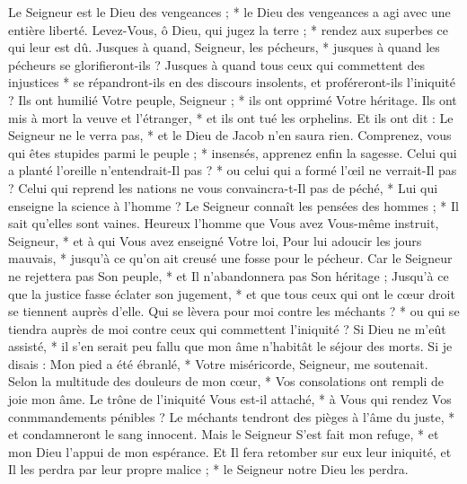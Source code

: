  Le Seigneur est le Dieu des vengeances ; * le Dieu des vengeances a agi avec une entière liberté.
\versseparator
 Levez-Vous, ô Dieu, qui jugez la terre ; * rendez aux superbes ce qui leur est dû.
\versseparator
 Jusques à quand, Seigneur, les pécheurs, * jusques à quand les pécheurs se glorifieront-ils ?
\versseparator
 Jusques à quand tous ceux qui commettent des injustices * se répandront-ils en des discours insolents, et proféreront-ils l'iniquité ?
\versseparator
 Ils ont humilié Votre peuple, Seigneur ; * ils ont opprimé Votre héritage.
\versseparator
 Ils ont mis à mort la veuve et l'étranger, * et ils ont tué les orphelins.
\versseparator
 Et ils ont dit : Le Seigneur ne le verra pas, * et le Dieu de Jacob n'en saura rien.
\versseparator
 Comprenez, vous qui êtes stupides parmi le peuple ; * insensés, apprenez enfin la sagesse.
\versseparator
 Celui qui a planté l'oreille n'entendrait-Il pas ? * ou celui qui a formé l'œil ne verrait-Il pas ?
\versseparator
 Celui qui reprend les nations ne vous convaincra-t-Il pas de péché, * Lui qui enseigne la science à l'homme ?
\versseparator
 Le Seigneur connaît les pensées des hommes ; * Il sait qu'elles sont vaines.
\versseparator
 Heureux l'homme que Vous avez Vous-même instruit, Seigneur, * et à qui Vous avez enseigné Votre loi,
\versseparator
 Pour lui adoucir les jours mauvais, * jusqu'à ce qu'on ait creusé une fosse pour le pécheur.
\versseparator
 Car le Seigneur ne rejettera pas Son peuple, * et Il n'abandonnera pas Son héritage ;
\versseparator
 Jusqu'à ce que la justice fasse éclater son jugement, * et que tous ceux qui ont le cœur droit se tiennent auprès d'elle.
\versseparator
 Qui se lèvera pour moi contre les méchants ? * ou qui se tiendra auprès de moi contre ceux qui commettent l'iniquité ?
\versseparator
 Si Dieu ne m'eût assisté, * il s'en serait peu fallu que mon âme n'habitât le séjour des morts.
\versseparator
 Si je disais : Mon pied a été ébranlé, * Votre miséricorde, Seigneur, me soutenait.
\versseparator
 Selon la multitude des douleurs de mon cœur, * Vos consolations ont rempli de joie mon âme.
\versseparator
 Le trône de l'iniquité Vous est-il attaché, * à Vous qui rendez Vos conmmandements pénibles ?
\versseparator
 Le méchants tendront des pièges à l'âme du juste, * et condamneront le sang innocent.
\versseparator
 Mais le Seigneur S'est fait mon refuge, * et mon Dieu l'appui de mon espérance.
\versseparator
 Et Il fera retomber sur eux leur iniquité, et Il les perdra par leur propre malice ; * le Seigneur notre Dieu les perdra.